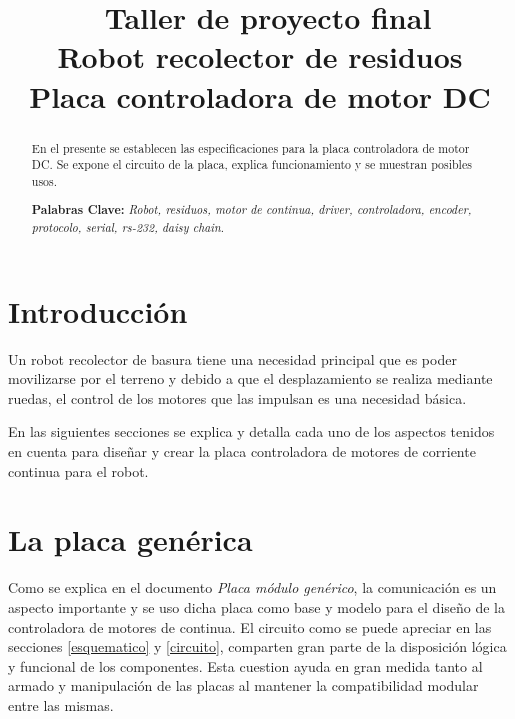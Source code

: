 \documentclass[a4paper,10pt]{article}
\begin{document}
\title{{\ Taller de proyecto final \\ Robot recolector de residuos \\ Placa controladora de motor DC}}



\maketitle

\begin{abstract}
En el presente se establecen las especificaciones para la placa controladora de motor DC.
Se expone el circuito de la placa, explica funcionamiento y se muestran posibles usos.

\textbf{Palabras Clave: }\emph{Robot, residuos, motor de continua, driver, controladora, encoder, protocolo, serial, rs-232, daisy chain}.
\end{abstract}



\section{Introducci\'on}
\label{introduccion}

Un robot recolector de basura tiene una necesidad principal que es poder movilizarse por el terreno y debido a que el desplazamiento se realiza
mediante ruedas, el control de los motores que las impulsan es una necesidad b\'asica.

En las siguientes secciones se explica y detalla cada uno de los aspectos tenidos en cuenta para dise\~nar y crear la placa controladora de motores
de corriente continua para el robot.

\section{La placa gen\'erica}
\label{placagenerica}

Como se explica en el documento \emph{Placa m\'odulo gen\'erico}, la comunicaci\'on es un aspecto importante y se uso dicha placa como base y modelo
para el dise\~no de la controladora de motores de continua. El circuito como se puede apreciar en las secciones \ref{esquematico} y \ref{circuito},
comparten gran parte de la disposici\'on l\'ogica y funcional de los componentes. Esta cuestion ayuda en gran medida tanto al armado y manipulaci\'on
de las placas al mantener la compatibilidad modular entre las mismas.
\end{document}
